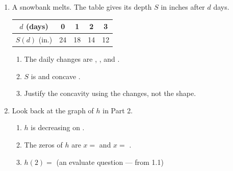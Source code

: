 \documentclass[10pt]{article}
\begin{document}
\vspace{0.1in}

\boxguard[24]
\begin{practicebox}
\begin{enumerate}[itemsep=8pt]
  \item A snowbank melts. The table gives its depth $S$ in inches after $d$
        days.

        \smallskip
        \renewcommand{\arraystretch}{1.4}
        \begin{tabular}{|c|c|c|c|c|}
        \hline
        $d$ (days) & 0 & 1 & 2 & 3 \\
        \hline
        $S(d)$ (in.) & 24 & 18 & 14 & 12 \\
        \hline
        \end{tabular}
        \smallskip

        \begin{enumerate}[label=(\alph*), itemsep=4pt]
          \item The daily changes are \blank{1.4cm}, \blank{1.4cm}, and
                \blank{1.4cm}.
          \item $S$ is \blank{2.6cm} and concave \blank{1.4cm}.
          \item Justify the concavity using the changes, not the shape.

                \vspace{0.05in}
        \end{enumerate}

  \item Look back at the graph of $h$ in Part 2.

        \begin{enumerate}[label=(\alph*), itemsep=4pt]
          \item $h$ is decreasing on \blank{2.6cm}.
          \item The zeros of $h$ are $x = $ \blank{1.2cm} and $x = $ \blank{1.2cm}.
          \item $h(2) = $ \blank{1.2cm} \quad (an evaluate question --- from 1.1)
        \end{enumerate}
\end{enumerate}
\end{practicebox}
\end{document}

